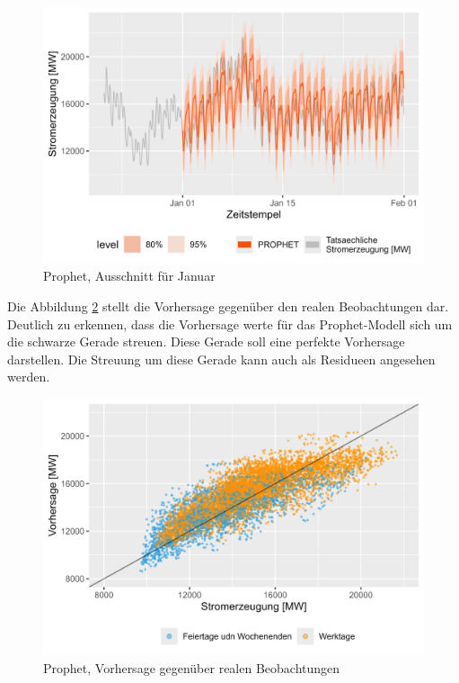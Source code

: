 \documentclass[11pt,ngerman,a4paper,]{article}
\begin{document}
\begin{figure}[H]
\centering
\includegraphics[width=1.0\textwidth]{plots/statistic_approach_PROPHET.png}
\caption{Prophet, Ausschnitt für Januar}
\label{fig:prophet_january}
\end{figure}

Die Abbildung \ref{fig:prophet_real_sim} stellt die Vorhersage gegenüber den realen Beobachtungen dar. Deutlich zu erkennen, dass die Vorhersage werte für das Prophet-Modell sich um die schwarze Gerade streuen. Diese Gerade soll eine perfekte Vorhersage darstellen. Die Streuung um diese Gerade kann auch als Residueen angesehen werden.

\begin{figure}[H]
\centering
\includegraphics[width=1.0\textwidth]{plots/real_to_fc_statistic_approach_PROPHET.png}
\caption{Prophet, Vorhersage gegenüber realen Beobachtungen}
\label{fig:prophet_real_sim}
\end{figure}
\end{document}
